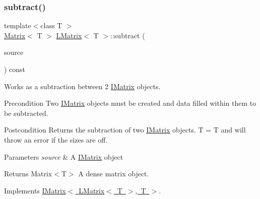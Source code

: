 \subsubsection{\texorpdfstring{subtract()}{subtract()}\hspace{0.1cm}{\footnotesize\ttfamily [3/6]}}
{\footnotesize\ttfamily template$<$class T $>$ \\
\mbox{\hyperlink{class_matrix}{Matrix}}$<$ T $>$ \mbox{\hyperlink{class_l_matrix}{L\+Matrix}}$<$ T $>$\+::subtract (\begin{DoxyParamCaption}\item[{const \mbox{\hyperlink{class_i_matrix}{I\+Matrix}}$<$ \mbox{\hyperlink{class_l_matrix}{L\+Matrix}}$<$ T $>$, T $>$ \&}]{source }\end{DoxyParamCaption}) const\hspace{0.3cm}{\ttfamily [virtual]}}



Works as a subtraction between 2 \mbox{\hyperlink{class_i_matrix}{I\+Matrix}} objects. 

\begin{DoxyPrecond}{Precondition}
Two \mbox{\hyperlink{class_i_matrix}{I\+Matrix}} objects must be created and data filled within them to be subtracted. 
\end{DoxyPrecond}
\begin{DoxyPostcond}{Postcondition}
Returns the subtraction of two \mbox{\hyperlink{class_i_matrix}{I\+Matrix}} objects. T = T and will throw an error if the sizes are off.
\end{DoxyPostcond}

\begin{DoxyParams}{Parameters}
{\em source} & A \mbox{\hyperlink{class_i_matrix}{I\+Matrix}} object \\
\hline
\end{DoxyParams}
\begin{DoxyReturn}{Returns}
Matrix$<$\+T$>$ A dense matrix object. 
\end{DoxyReturn}


Implements \mbox{\hyperlink{class_i_matrix_a0bf5046efed75799656059ce2980a851}{I\+Matrix$<$ L\+Matrix$<$ T $>$, T $>$}}.

\mbox{\label{class_l_matrix_ac9aa4095900b986bbc699930be39384e}} 
